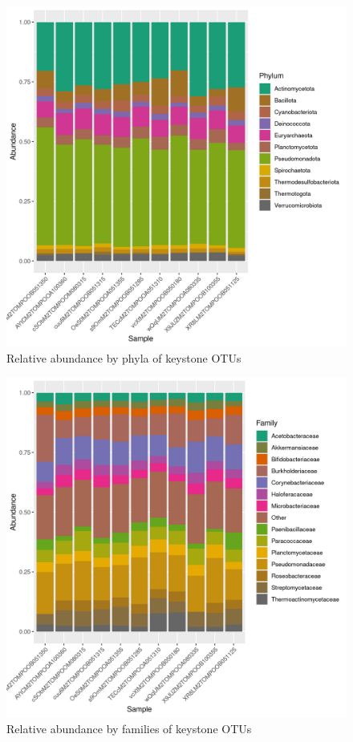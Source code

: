 \begin{figure}
\centering
\includegraphics[scale = 0.8]{tomate_aleatorio1_4.csv_relative_abundance_Phylum.png}
\caption{Relative abundance by phyla of keystone OTUs }
\label{fig:tomate_aleatorio1_4.csv_phyla}
\end{figure}
\begin{figure}
\centering
\includegraphics[scale = 0.8]{tomate_aleatorio1_4.csv_relative_abundance_Family.png}
\caption{Relative abundance by families of keystone OTUs }
\label{fig:tomate_aleatorio1_4.csv_family}
\end{figure}
